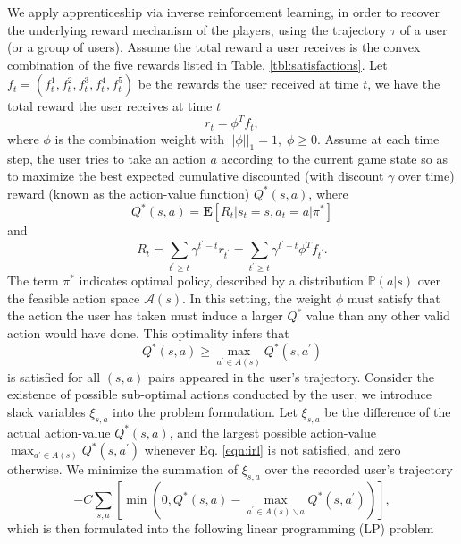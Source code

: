 \documentclass{sigchi}
\begin{document}
We apply apprenticeship via inverse reinforcement learning, in order to recover the underlying reward mechanism of the players, using the trajectory $\tau$ of a user (or a group of users). Assume the total reward a user receives is the convex combination of the five rewards listed in Table. \ref{tbl:satisfactions}. Let $f_t=(f_t^1,f_t^2,f_t^3,f_t^4,f_t^5)$ be the rewards the user received at time $t$, we have the total reward the user receives at time $t$ $$r_t=\phi^Tf_t,$$ 
where $\phi$ is the combination weight with $||\phi||_1=1, \; \phi \geq 0$. Assume at each time step, the user tries to take an action $a$ according to the current game state so as to maximize the best expected cumulative discounted (with discount $\gamma$ over time) reward (known as the action-value function) $Q^\ast(s, a)$, where
$$Q^\ast(s,a)=\mathbf{E}[R_t | s_{t}=s, a_{t}=a | \pi^\ast]$$
and
$$R_t=\sum_{t^\prime\geq t}\gamma^{t^\prime-t}r_{t^\prime}=\sum_{t^\prime\geq t}\gamma^{t^\prime-t}\phi^Tf_{t^\prime}.$$
The term $\pi^\ast$ indicates optimal policy, described by a distribution $\mathbb{P}(a|s)$ over the feasible action space $\mathcal{A}(s)$. In this setting, the weight $\phi$ must satisfy that the action the user has taken must induce a larger $Q^\ast$ value than any other valid action would have done. This optimality infers that
\begin{equation}
Q^\ast(s,a) \geq \max_{a^\prime \in A(s)}Q^\ast(s,a^\prime) \label{eqn:irl}
\end{equation}
is satisfied for all $(s,a)$ pairs appeared in the user's trajectory. Consider the existence of possible sub-optimal actions conducted by the user, we introduce slack variables $\xi_{s,a}$ into the problem formulation. Let $\xi_{s,a}$ be the difference of the actual action-value $Q^\ast(s,a)$, and the largest possible action-value $\max_{a^\prime \in A(s)}Q^\ast(s,a^\prime)$ whenever Eq. \eqref{eqn:irl} is not satisfied, and zero otherwise. We minimize the summation of $\xi_{s,a}$ over the recorded user's trajectory
\begin{equation}
-C\sum_{s,a} \left[\min(0, Q^\ast(s,a) - \max_{a^\prime \in A(s)\backslash a}Q^\ast(s,a^\prime))\right], \label{eqn:slack}
\end{equation}
which is then formulated into the following linear programming (LP) problem
\end{document}
